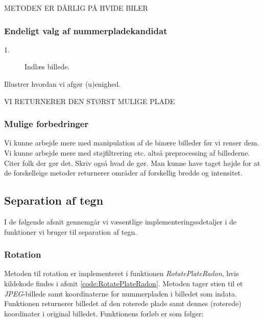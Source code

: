 METODEN ER DÅRLIG PÅ HVIDE BILER




\subsubsection{Endeligt valg af nummerpladekandidat}
\begin{description}
\item[1.] Indlæs billede.
\end{description}


Illustrer hvordan vi afgør (u)enighed. 

VI RETURNERER DEN STØRST MULIGE PLADE

\subsubsection{Mulige forbedringer}
Vi kunne arbejde mere med manipulation af de binære billeder før vi renser dem. Vi kunne arbejde mere med støjfiltrering etc. altså preprocessing af billederne. Citer folk der gør det. Skriv også hvad de gør.
Man kunne have taget højde for at de forskelleige metoder returnerer områder af forskellig bredde og intensitet.



\subsection{Separation af tegn}

I de følgende afsnit gennemgår vi væsentlige implementeringssdetaljer i de funktioner vi bruger til separation af tegn. 

\subsubsection{Rotation}
\label{sec:implementation/sep/rotation}

Metoden til rotation er implementeret i funktionen \textit{RotatePlateRadon}, hvis kildekode findes i afsnit \vref{code:RotatePlateRadon}. Metoden tager stien til et \textit{JPEG}-billede samt koordinaterne for nummerpladen i billedet som indata. Funktionen returnerer billedet af den roterede plade samt dennes (roterede) koordinater i original billedet. Funktionens forløb er som følger:

